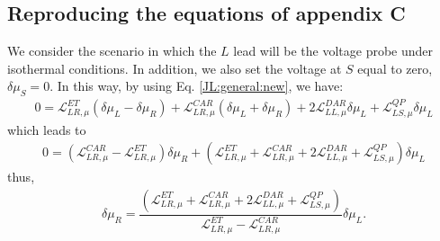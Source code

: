 \subsection{Reproducing the equations of appendix C}

We consider the scenario in which the $L$ lead will be the voltage probe under isothermal conditions. In addition, we also set the voltage at $S$ equal to zero, $\delta\mu_{S}=0$. In this way, by using Eq. \eqref{JL:general:new}, we have:
\begin{align*}
0=
\mathcal{L}_{LR,\mu}^{ET}(\delta\mu_{L}-\delta\mu_{R})+
\mathcal{L}_{LR,\mu}^{CAR}\left(\delta\mu_{L}+\delta\mu_{R}\right)
+
2\mathcal{L}_{LL,\mu}^{DAR}\delta\mu_{L}
+
\mathcal{L}^{QP}_{LS,\mu}\delta\mu_{L}
\end{align*}
which leads to
\begin{align*}
0=
(\mathcal{L}_{LR,\mu}^{CAR}-\mathcal{L}_{LR,\mu}^{ET})\delta\mu_{R}+
(\mathcal{L}_{LR,\mu}^{ET}+\mathcal{L}_{LR,\mu}^{CAR}+2\mathcal{L}_{LL,\mu}^{DAR}
+
\mathcal{L}^{QP}_{LS,\mu})\delta\mu_{L}
\end{align*}
thus, 
\begin{align}\label{delta:mRmL}
\delta\mu_{R}=\dfrac{(\mathcal{L}_{LR,\mu}^{ET}+\mathcal{L}_{LR,\mu}^{CAR}+2\mathcal{L}_{LL,\mu}^{DAR}
+
\mathcal{L}^{QP}_{LS,\mu})}{\mathcal{L}_{LR,\mu}^{ET}-\mathcal{L}_{LR,\mu}^{CAR}}\delta\mu_{L}.
\end{align}


